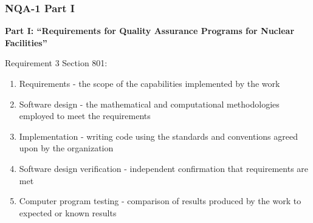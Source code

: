 \documentclass[12pt]{beamer}
\begin{document}
\begin{frame}
\frametitle{NQA-1 Part I}

{\bf Part I: ``Requirements for Quality Assurance Programs for Nuclear Facilities''}

Requirement 3 Section 801:
\begin{enumerate}
\item{\alert{Requirements} - the scope of the capabilities implemented by the work}
\item{\alert{Software design} - the mathematical and computational methodologies employed to meet the requirements}
\item{\alert{Implementation} - writing code using the standards and conventions agreed upon by the organization}
\item{\alert{Software design verification} - independent confirmation that requirements are met}
\item{\alert{Computer program testing} - comparison of results produced by the work to expected or known results}
\end{enumerate}
\end{frame}
\end{document}
